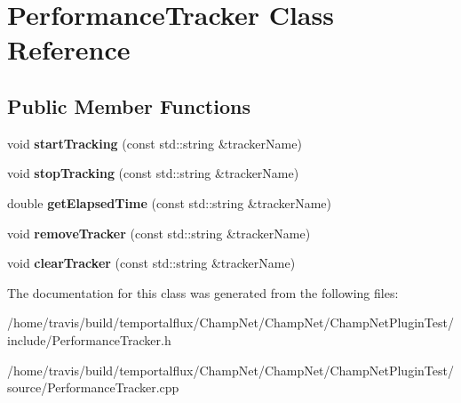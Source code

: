 \hypertarget{class_performance_tracker}{\section{Performance\-Tracker Class Reference}
\label{class_performance_tracker}
}
\subsection*{Public Member Functions}
\begin{DoxyCompactItemize}
\item 
\hypertarget{class_performance_tracker_abffee8acc3818592a7011dec4c6100c8}{void {\bfseries start\-Tracking} (const std\-::string \&tracker\-Name)}\label{class_performance_tracker_abffee8acc3818592a7011dec4c6100c8}

\item 
\hypertarget{class_performance_tracker_ac1dfa09a27f6dd1baeeb8068b009a432}{void {\bfseries stop\-Tracking} (const std\-::string \&tracker\-Name)}\label{class_performance_tracker_ac1dfa09a27f6dd1baeeb8068b009a432}

\item 
\hypertarget{class_performance_tracker_a6197691d9a0e4bce1d69e78a589a31fb}{double {\bfseries get\-Elapsed\-Time} (const std\-::string \&tracker\-Name)}\label{class_performance_tracker_a6197691d9a0e4bce1d69e78a589a31fb}

\item 
\hypertarget{class_performance_tracker_a0caacd20bc7e668cdfb9ef9567df6aeb}{void {\bfseries remove\-Tracker} (const std\-::string \&tracker\-Name)}\label{class_performance_tracker_a0caacd20bc7e668cdfb9ef9567df6aeb}

\item 
\hypertarget{class_performance_tracker_a81acadf369ceab082eea07241eb14866}{void {\bfseries clear\-Tracker} (const std\-::string \&tracker\-Name)}\label{class_performance_tracker_a81acadf369ceab082eea07241eb14866}

\end{DoxyCompactItemize}


The documentation for this class was generated from the following files\-:\begin{DoxyCompactItemize}
\item 
/home/travis/build/temportalflux/\-Champ\-Net/\-Champ\-Net/\-Champ\-Net\-Plugin\-Test/include/Performance\-Tracker.\-h\item 
/home/travis/build/temportalflux/\-Champ\-Net/\-Champ\-Net/\-Champ\-Net\-Plugin\-Test/source/Performance\-Tracker.\-cpp\end{DoxyCompactItemize}
